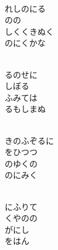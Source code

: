 \documentclass[10pt,b5j]{tarticle} %
\begin{document}
\vspace{1.5em} %
\newcommand{\linespace}{0.5em} %
\newcommand{\blocksize}{0.5\hsize} %
\newcommand{\itemmargin}{6em} %
\begin{enumerate} %
    \setlength{\itemindent}{\itemmargin} %
    \begin{minipage}[c]{\blocksize}
    
        \vspace{\linespace}
        \item~\\
        れしのにる\\
        のの\\
        しくくきぬく\\
        のにくかな
        
        \vspace{\linespace}
        \item~\\
        るのせに\\
        しぼる\\
        ふみては\\
        るもしまぬ
        
        \vspace{\linespace}
        \item~\\
        きのふぞるに\\
        をひつつ\\
        のゆくの\\
        のにみく
        
        \vspace{\linespace}
        \item~\\
        にふりて\\
        くやのの\\
        がにし\\
        をはん
        

\end{minipage}
\end{enumerate}
\end{document}

